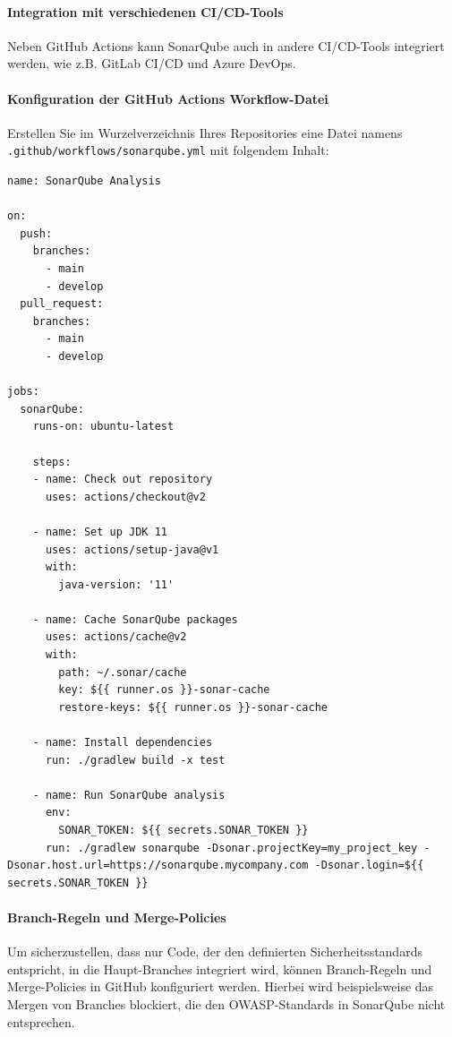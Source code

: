 \paragraph{Integration mit verschiedenen CI/CD-Tools}

Neben GitHub Actions kann SonarQube auch in andere CI/CD-Tools integriert werden, wie z.B. GitLab CI/CD und Azure DevOps.


\paragraph{Konfiguration der GitHub Actions Workflow-Datei}

Erstellen Sie im Wurzelverzeichnis Ihres Repositories eine Datei namens \texttt{.github/workflows/sonarqube.yml} mit folgendem Inhalt:

\begin{lstlisting}
name: SonarQube Analysis

on:
  push:
    branches:
      - main
      - develop
  pull_request:
    branches:
      - main
      - develop

jobs:
  sonarQube:
    runs-on: ubuntu-latest

    steps:
    - name: Check out repository
      uses: actions/checkout@v2

    - name: Set up JDK 11
      uses: actions/setup-java@v1
      with:
        java-version: '11'

    - name: Cache SonarQube packages
      uses: actions/cache@v2
      with:
        path: ~/.sonar/cache
        key: ${{ runner.os }}-sonar-cache
        restore-keys: ${{ runner.os }}-sonar-cache

    - name: Install dependencies
      run: ./gradlew build -x test

    - name: Run SonarQube analysis
      env:
        SONAR_TOKEN: ${{ secrets.SONAR_TOKEN }}
      run: ./gradlew sonarqube -Dsonar.projectKey=my_project_key -Dsonar.host.url=https://sonarqube.mycompany.com -Dsonar.login=${{ secrets.SONAR_TOKEN }}
\end{lstlisting}

\paragraph{Branch-Regeln und Merge-Policies}

Um sicherzustellen, dass nur Code, der den definierten Sicherheitsstandards entspricht, in die Haupt-Branches integriert wird, können Branch-Regeln und Merge-Policies in GitHub konfiguriert werden. Hierbei wird beispielsweise das Mergen von Branches blockiert, die den OWASP-Standards in SonarQube nicht entsprechen.


